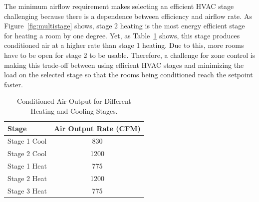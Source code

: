 \begin{figure}[!htb]
\end{figure}

The minimum airflow requirement makes selecting an efficient HVAC stage
challenging because there is a dependence between efficiency and airflow rate. As
Figure~\ref{fig:multistage} shows, stage 2 heating is the most energy efficient
stage for heating a room by one degree. Yet, as Table~\ref{table:stageAirflow}
shows, this stage produces conditioned air at a higher rate than stage 1
heating. Due to this, more rooms have to be open for stage 2 to be
usable. Therefore, a challenge for zone control is making this trade-off between
using efficient HVAC stages and minimizing the load on the selected stage so
that the rooms being conditioned reach the setpoint faster. 

\begin{table}[!htb]
{
  \begin{tabular}{|l|c|} \hline
    Stage & Air Output Rate (CFM) \\ \hline\hline
    Stage 1 Cool & 830
    \\ \hline
    Stage 2 Cool & 1200
    \\ \hline
    Stage 1 Heat & 775
    \\ \hline
    Stage 2 Heat & 1200
    \\ \hline
    Stage 3 Heat & 775
    \\ \hline
    \end{tabular}}
\caption[Conditioned Air Output for Different Heating and Cooling
  Stages]{Conditioned Air Output for Different Heating and Cooling Stages.}
\label{table:stageAirflow}
\end{table}

